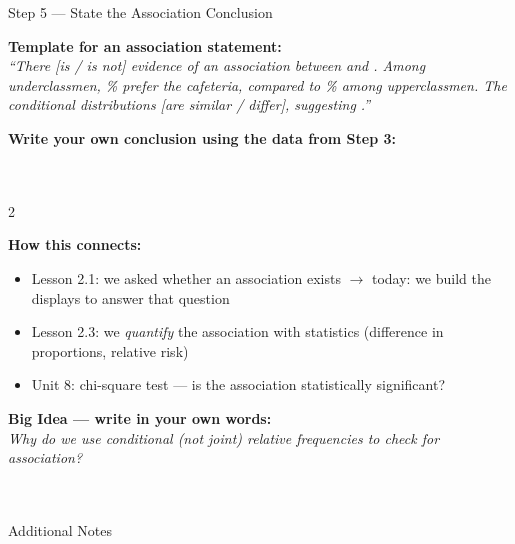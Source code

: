 \documentclass[10pt]{article}
\begin{document}
\begin{notesbox}{Step 5 --- State the Association Conclusion}
\small

\textbf{Template for an association statement:}\\[4pt]
\textit{``There \blank{1.5cm} [is / is not] evidence of an association between
\blank{3cm} and \blank{3cm}. Among underclassmen, \blank{2cm}\% prefer the cafeteria,
compared to \blank{2cm}\% among upperclassmen. The conditional distributions
\blank{3cm} [are similar / differ], suggesting \blank{3cm}.''}

\vspace{8pt}
\textbf{Write your own conclusion using the data from Step 3:}\\[4pt]
\writeline\\[1pt]\writeline\\[1pt]\writeline

\end{notesbox}

\vspace{0.1in}

\begin{spiralbox}
\small
\begin{multicols}{2}

\textbf{How this connects:}
\begin{itemize}[itemsep=3pt]
  \item Lesson 2.1: we asked whether an association exists
        $\to$ today: we build the displays to answer that question
  \item Lesson 2.3: we \emph{quantify} the association with
        statistics (difference in proportions, relative risk)
  \item Unit 8: chi-square test --- is the association statistically significant?
\end{itemize}

\columnbreak

\textbf{Big Idea --- write in your own words:}\\
\textit{Why do we use conditional (not joint) relative
frequencies to check for association?}\\[2pt]
\writeline\\[1pt]\writeline\\[1pt]\writeline

\end{multicols}
\end{spiralbox}

\vspace{0.1in}

\begin{notesbox}{Additional Notes}
\vspace{0pt}
\writeline\\\writeline\\\writeline\\\writeline\\\writeline\\\writeline
\end{notesbox}
\end{document}
